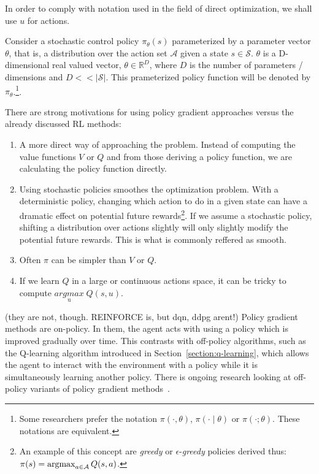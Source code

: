 \documentclass{../main.tex}{subfiles}
\begin{document}
In order to comply with notation used in the field of direct optimization, we shall use $u$ for actions.

Consider a stochastic control policy  $\pi_{\theta}(s)$ parameterized by a parameter vector $\theta$, that is, a distribution over the action set $\mathcal{A}$ given a state $s \in \mathcal{S}$. $\theta$ is a D-dimensional real valued vector,  $\theta \in \mathbb{R}^{D}$, where $D$ is the number of parameters / dimensions and $D << |\mathcal{S}|$. This prameterized policy function will be denoted by $\pi_{\theta}$.\footnote{Some researchers prefer the notation $\pi(\cdot, \theta)$, $\pi(\cdot \mid \theta)$ or $\pi(\cdot; \theta)$. These notations are equivalent.}. 

There are strong motivations for using policy gradient approaches versus the already discussed RL methods:
\begin{enumerate}
\item A more direct way of approaching the problem. Instead of computing the value functions $V$ or $Q$ and from those deriving a policy function, we are calculating the policy function directly.
\item Using stochastic policies smoothes the optimization problem. With a deterministic policy, changing which action to do in a given state can have a dramatic effect on potential future rewards\footnote{An example of this concept are \textit{greedy} or $\epsilon$-\textit{greedy} policies derived thus: $\pi(s) = \operatorname*{argmax}_{a \in \mathcal{A}} Q(s,a)$.}. If we assume a stochastic policy, shifting a distribution over actions slightly will only slightly modify the potential future rewards. This is what is commonly reffered as smooth.
\item Often $\pi$ can be simpler than $V$ or $Q$.
\item If we learn $Q$ in a large or continuous actions space, it can be tricky to compute $\underset{\text{u}}{argmax}\; Q(s,u)$.
\end{enumerate}
 
(they are not, though. REINFORCE is, but dqn, ddpg arent!) Policy gradient methods are on-policy. In them, the agent acts with using a policy which is improved gradually over time. This contrasts with off-policy algorithms, such as the Q-learning algorithm introduced in Section~\ref{section:q-learning}, which allows the agent to interact with the environment with a policy while it is simultaneously learning another policy. There is ongoing research looking at off-policy variants of policy gradient methods~\citep{Mnih2013, Mnih2016}. 
\end{document}
